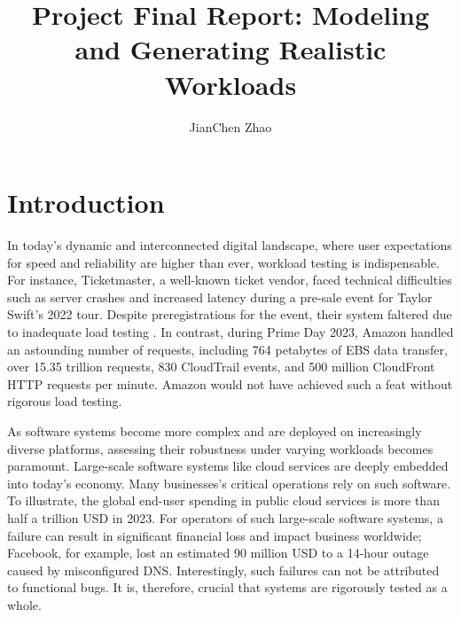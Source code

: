 

\title{Project Final Report: Modeling and Generating Realistic Workloads}
\author{JianChen Zhao}




\begin{abstract}
\end{abstract}

\maketitle

\section{Introduction}

In today's dynamic and interconnected digital landscape, where user expectations for speed and reliability are higher than ever, workload testing is indispensable. For instance, Ticketmaster, a well-known ticket vendor, faced technical difficulties such as server crashes and increased latency during a pre-sale event for Taylor Swift's 2022 tour. Despite preregistrations for the event, their system faltered due to inadequate load testing \cite{Reuters2022-dc}. In contrast, during Prime Day 2023, Amazon handled an astounding number of requests, including 764 petabytes of EBS data transfer, over 15.35 trillion requests, 830 CloudTrail events, and 500 million CloudFront HTTP requests per minute. Amazon would not have achieved such a feat without rigorous load testing\cite{Barr2023-wr}.

As software systems become more complex and are deployed on increasingly diverse platforms, assessing their robustness under varying workloads becomes paramount. Large-scale software systems like cloud services are deeply embedded into today's economy. Many businesses's critical operations rely on such software. To illustrate, the global end-user spending in public cloud services is more than half a trillion USD in 2023\cite{UnknownUnknown-aj}. For operators of such large-scale software systems, a failure can result in significant financial loss and impact business worldwide\cite{LuuUnknown-mo}; Facebook, for example, lost an estimated 90 million USD to a 14-hour outage caused by misconfigured DNS\cite{AtlassianUnknown-sw}. Interestingly, such failures can not be attributed to functional bugs\cite{Weyuker2000-gw}. It is, therefore, crucial that systems are rigorously tested as a whole.

